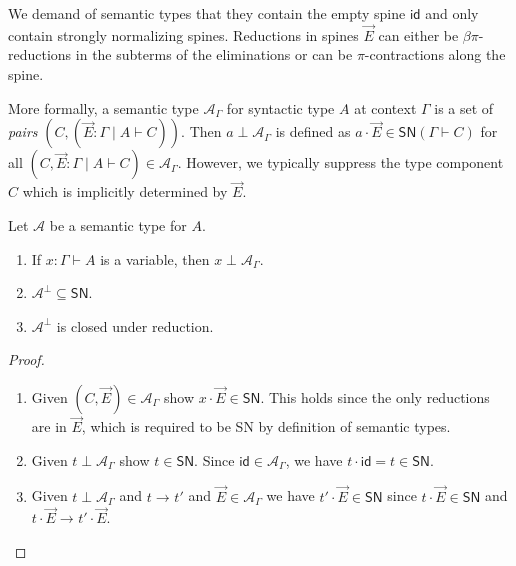 \documentclass[a4paper,USenglish,cleveref, autoref, thm-restate]{lipics-v2021}
\newcommand{\bla}{\ensuremath{\mbox{$$}}}
\newcommand{\tid}{\mathsf{id}}
\newcommand{\ru}{\dfrac}
\newcommand{\red}[1][]{\longrightarrow_{#1}}
\newcommand{\A}{\mathcal{A}}
\newcommand{\SN}{\mathsf{SN}}
\begin{document}

We demand of semantic types that they contain the
empty spine $\tid$
and only contain strongly normalizing
spines.
Reductions \fbox{$\vec E \red \vec E'$} in spines $\vec E$ can either be
$\beta\pi$-reductions in the subterms of the eliminations or can be
$\pi$-contractions along the spine.

More formally, a semantic type $\A_\Gamma$ for syntactic type $A$ at
context $\Gamma$ is a set of \emph{pairs}
$(C, (\vec E : \Gamma \mid A \vdash C))$.
Then $a \perp \A_\Gamma$ is defined as
$a \cdot \vec E \in \SN(\Gamma \vdash C)$
for all $(C, \vec E : \Gamma \mid A \vdash C) \in \A_\Gamma$.
However, we typically
suppress the type component $C$ which is implicitly determined by
$\vec E$.
\begin{lemma}
  Let $\A$ be a semantic type for $A$.
  \begin{enumerate}
  \item If $x : \Gamma \vdash A$ is a variable, then $x \perp
    \A_\Gamma$.
  \item $\A^\perp \subseteq \SN$.
  \item $\A^\perp$ is closed under reduction.
  \end{enumerate}
\end{lemma}
\begin{proof} \bla
  \begin{enumerate}
  \item Given $(C, \vec E) \in \A_\Gamma$ show $x \cdot \vec E \in
    \SN$.  This holds since the only reductions are in $\vec E$, which
    is required to be SN by definition of semantic types.

  \item Given $t \perp \A_\Gamma$ show $t \in \SN$.
   Since $\tid \in \A_\Gamma$, we have $t \cdot \tid = t \in \SN$.

  \item Given $t \perp \A_\Gamma$ and $t \red t'$ and $\vec E \in \A_\Gamma$ we
    have $t' \cdot \vec E \in \SN$ since $t \cdot \vec E \in \SN$ and
    $t \cdot \vec E \red t' \cdot \vec E$.
  \popQED
  \end{enumerate}
\end{proof}
\end{document}
